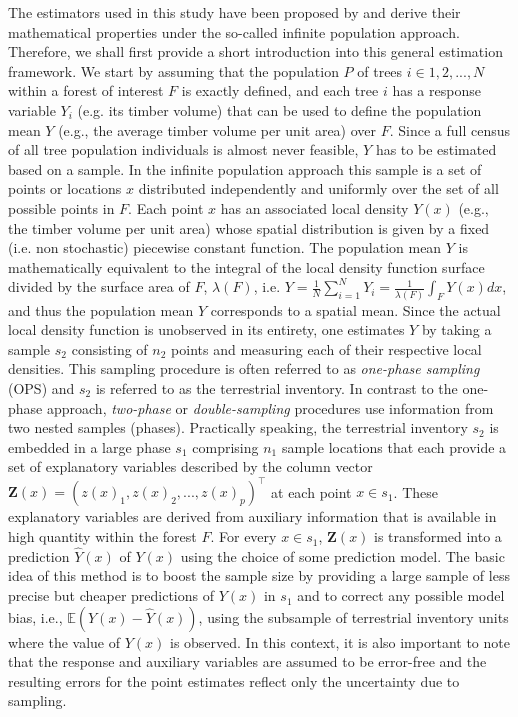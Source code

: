\documentclass[remotesensing,article,submit,moreauthors,pdftex,10pt,a4paper]{mdpi}
\newcommand{\EX}{\mathbb{E}}
\begin{document}
The estimators used in this study have been proposed by \citep{mandallaz2013a,mandallaz2013b} and derive their mathematical properties under the so-called infinite population approach. Therefore, we shall first provide a short introduction into this general estimation framework. We start by assuming that the population $P$ of trees $i \in 1,2, ..., N$ within a forest of interest $F$ is exactly defined, and each tree $i$ has a response variable $Y_i$ (e.g. its timber volume) that can be used to define the population mean $Y$ (e.g., the average timber volume per unit area) over $F$. Since a full census of all tree population individuals is almost never feasible, $Y$ has to be estimated based on a sample. In the infinite population approach this sample is a set of points or locations $x$ distributed independently and uniformly over the set of all possible points in $F$. Each point $x$ has an associated local density $Y(x)$ (e.g., the timber volume per unit area) whose spatial distribution is given by a fixed (i.e. non stochastic) piecewise constant function. The population mean $Y$ is mathematically equivalent to the integral of the local density function surface divided by the surface area of $F$, $\lambda(F)$, i.e. $Y=\frac{1}{N} \sum_{i=1}^{N}Y_i=\frac{1}{\lambda(F)}\int_{F}Y(x)dx$, and thus the population mean $Y$ corresponds to a spatial mean. Since the actual local density function is unobserved in its entirety, one estimates $Y$ by taking a sample $s_2$ consisting of $n_2$ points and measuring each of their respective local densities. This sampling procedure is often referred to as \textit{one-phase sampling} (OPS) and $s_2$ is referred to as the terrestrial inventory. In contrast to the one-phase approach, \textit{two-phase} or \textit{double-sampling} procedures use information from two nested samples (phases). Practically speaking, the terrestrial inventory $s_2$ is embedded in a large phase $s_1$ comprising $n_1$ sample locations that each provide a set of explanatory variables described by the column vector $\pmb{Z}(x)=(z(x)_1, z(x)_2,...,z(x)_p)^{\top}$ at each point $x \in s_1$. These explanatory variables are derived from auxiliary information that is available in high quantity within the forest $F$. For every $x \in s_1$, $\pmb{Z}(x)$ is transformed into a prediction $\hat{Y}(x)$ of $Y(x)$ using the choice of some prediction model. The basic idea of this method is to boost the sample size by providing a large sample of less precise but cheaper predictions of $Y(x)$ in $s_1$ and to correct any possible model bias, i.e., $\EX{(Y(x)-\hat{Y}(x))}$, using the subsample of terrestrial inventory units where the value of $Y(x)$ is observed. In this context, it is also important to note that the response and auxiliary variables are assumed to be error-free and the resulting errors for the point estimates reflect only the uncertainty due to sampling.
\end{document}
